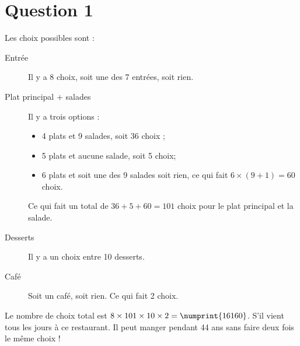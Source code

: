 \section*{Question 1}
Les choix possibles sont : 
\begin{description}
	\item[Entrée] Il y a 8 choix, soit une des 7 entrées, soit rien.
	\item[Plat principal + salades] Il y a trois options :
	\begin{itemize}
		\item 4 plats et 9 salades, soit 36 choix ;
		\item 5 plats et aucune salade, soit 5 choix;
		\item 6 plats et soit une des 9 salades soit rien, ce qui fait $6 \times (9 + 1) = 60$ choix.
	\end{itemize}
	Ce qui fait un total de $36+5+60 = 101$ choix pour le plat principal et la salade.
	\item[Desserts] Il y a un choix entre 10 desserts.
	\item[Café] Soit un café, soit rien. Ce qui fait 2 choix.
\end{description}

Le nombre de choix total est $ 8 \times 101 \times 10 \times 2 = \numprint{16160}$. S’il vient tous les jours à ce restaurant. Il peut manger pendant 44 ans sans faire deux fois le même choix !